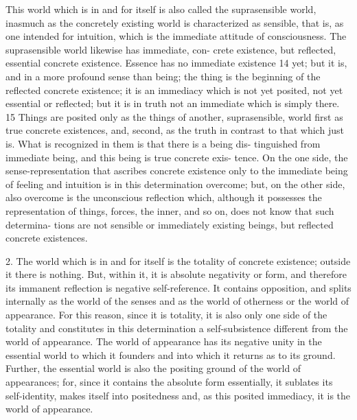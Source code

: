 This world which is in and for itself is also called the suprasensible
world, inasmuch as the concretely existing world is characterized as sensible,
that is, as one intended for intuition, which is the immediate attitude of
consciousness.
The suprasensible world likewise has immediate, con-
crete existence, but reflected, essential concrete existence. Essence has no
immediate existence 14 yet; but it is, and in a more profound sense than
being; the thing is the beginning of the reflected concrete existence; it
is an immediacy which is not yet posited, not yet essential or reflected;
but it is in truth not an immediate which is simply there. 15 Things are
posited only as the things of another, suprasensible, world
first as
true concrete existences, and, second, as the truth in contrast to that
which just is. What is recognized in them is that there is a being dis-
tinguished from immediate being, and this being is true concrete exis-
tence. On the one side, the sense-representation that ascribes concrete
existence only to the immediate being of feeling and intuition is in this
determination overcome; but, on the other side, also overcome is the
unconscious reflection which, although it possesses the representation of
things, forces, the inner, and so on, does not know that such determina-
tions are not sensible or immediately existing beings, but reflected concrete
existences.

2. The world which is in and for itself is
the totality of concrete existence;
outside it there is nothing.
But, within it, it is absolute negativity or form,
and therefore its immanent reflection is negative self-reference.
It contains
opposition, and splits internally as the world of the senses and as the
world of otherness or the world of appearance.
For this reason, since it
is totality, it is also only one side of the totality and constitutes in this
determination a self-subsistence different from the world of appearance.
The world of appearance has its negative unity in the essential world to
which it founders and into which it returns as to its ground.
Further, the
essential world is also the positing ground of the world of appearances; for,
since it contains the absolute form essentially, it sublates its self-identity,
makes itself into positedness and, as this posited immediacy, it is the world
of appearance.

